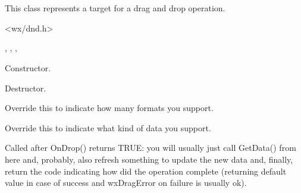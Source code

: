 \section{}\label{wxdroptarget}


This class represents a target for a drag and drop operation.




<wx/dnd.h>


, , 
, 


\label{wxdroptargetwxdroptarget}


Constructor.

\label{wxdroptargetdtor}


Destructor.

\label{wxdroptargetgetformatcount}


Override this to indicate how many formats you support.

\label{wxdroptargetgetformat}


Override this to indicate what kind of data you support.

\label{wxdroptargetondata}


Called after OnDrop() returns TRUE: you will usually just call
GetData() from here and, probably, also refresh something to update the
new data and, finally, return the code indicating how did the operation
complete (returning default value in case of success and wxDragError on
failure is usually ok).

